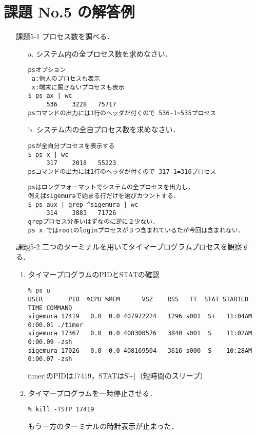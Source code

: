 \documentclass[a4j,twcolumn,11pt,nomag]{ltjarticle}      %
\begin{document}
\onecolumn

\section*{課題 No.5 の解答例}
\begin{itemize}
\item[課題5-1]
  プロセス数を調べる．
  \begin{enumerate}
  \item[a.] システム内の全プロセス数を求めなさい．
\begin{lstlisting}
psオプション
 a:他人のプロセスも表示
 x:端末に属さないプロセスも表示
$ ps ax | wc
     536    3228   75717
psコマンドの出力には1行のヘッダが付くので 536-1=535プロセス
\end{lstlisting}
  \item[b.] システム内の全自プロセス数を求めなさい．
\begin{lstlisting}
psが全自分プロセスを表示する
$ ps x | wc
     317    2018   55223
psコマンドの出力には1行のヘッダが付くので 317-1=316プロセス
\end{lstlisting}
\begin{lstlisting}
psはロングフォーマットでシステムの全プロセスを出力し，
例えばsigemuraで始まる行だけを選びカウントする．
$ ps aux | grep ^sigemura | wc
     314    3883   71726
grepプロセス分多いはずなのに逆に２少ない．
ps x ではrootのloginプロセスが３つ含まれているたが今回は含まれない．
\end{lstlisting}
  \end{enumerate}

\item[課題5-2]
二つのターミナルを用いてタイマープログラムプロセスを観察する．
  \begin{enumerate}
  \item タイマープログラムのPIDとSTATの確認
\lstset{basicstyle=\footnotesize\ttfamily}
\begin{lstlisting}
% ps u
USER       PID  %CPU %MEM      VSZ    RSS   TT  STAT STARTED      TIME COMMAND
sigemura 17419   0.0  0.0 407972224   1296 s001  S+   11:04AM   0:00.01 ./timer
sigemura 17367   0.0  0.0 408300576   3840 s001  S    11:02AM   0:00.09 -zsh
sigemura 17026   0.0  0.0 408169504   3616 s000  S    10:28AM   0:00.07 -zsh
\end{lstlisting}
\|timer|のPIDは17419，STATは\|S+|（短時間のスリープ）

  \item タイマープログラムを一時停止させる．
\lstset{basicstyle=\small\ttfamily}
\begin{lstlisting}
% kill -TSTP 17419
\end{lstlisting}
もう一方のターミナルの時計表示が止まった．


\end{enumerate}
\end{itemize}
\end{document}
